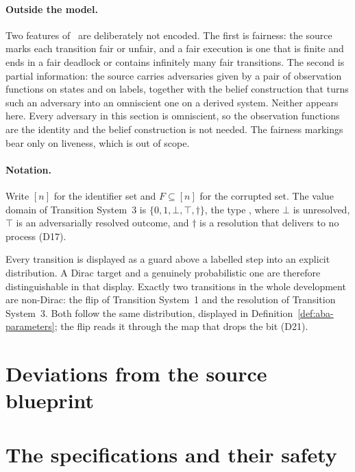\paragraph{Outside the model.}
Two features of~\cite{LeslieBP} are deliberately not encoded.
The first is fairness: the source marks each transition fair or unfair, and a fair execution is one that is finite and ends in a fair deadlock or contains infinitely many fair transitions.
The second is partial information: the source carries adversaries given by a pair of observation functions on states and on labels, together with the belief construction that turns such an adversary into an omniscient one on a derived system.
Neither appears here.
Every adversary in this section is omniscient, so the observation functions are the identity and the belief construction is not needed.
The fairness markings bear only on liveness, which is out of scope.

\paragraph{Notation.}
Write $[n]$ for the identifier set and $F \subseteq [n]$ for the corrupted set.
The value domain of Transition System~3 is $\{0,1,\bot,\top,\dagger\}$, the type
, where $\bot$ is unresolved, $\top$ is an adversarially
resolved outcome, and $\dagger$ is a resolution that delivers to no process (D17).

Every transition is displayed as a guard above a labelled step into an explicit distribution.
A Dirac target and a genuinely probabilistic one are therefore distinguishable in that display.
Exactly two transitions in the whole development are non-Dirac: the flip of Transition System~1 and the resolution of Transition System~3.
Both follow the same distribution, displayed in Definition~\ref{def:aba-parameters}; the flip reads it through the map that drops the bit (D21).


\section{Deviations from the source blueprint}
\label{sec:aba-deviations}




\section{The specifications and their safety}



